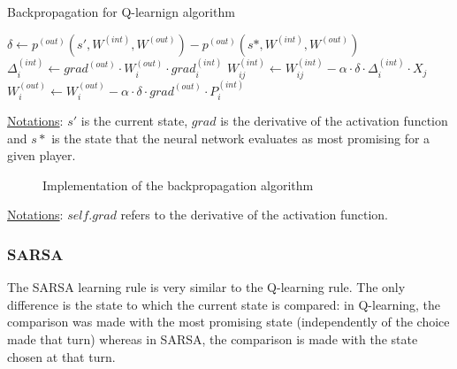 \documentclass{article}
\begin{document}
\begin{algorithm}[H]
	\caption{Backpropagation for Q-learnign algorithm}
	\label{alg:backprop}
	\begin{algorithmic}[1]
	    \State $\delta \leftarrow p^{(out)}(s',W^{(int)},W^{(out)})-p^{(out)}(s*,W^{(int)},W^{(out)}) $
		    \State $\Delta_{i}^{(int)} \leftarrow grad^{(out)} \cdot W_{i}^{(out)} \cdot grad_{i}^{(int)}$
    		    \State $ W_{ij}^{(int)} \leftarrow W_{ij}^{(int)} - \alpha \cdot \delta \cdot \Delta_{i}^{(int)} \cdot X_{j} $
	    	\EndFor
	    	\State $ W_{i}^{(out)} \leftarrow W_{i}^{(out)} - \alpha \cdot \delta \cdot grad^{(out)} \cdot P_{i}^{(int)} $
	    \EndFor
	\end{algorithmic} 
\end{algorithm}

\underline{Notations}: $s'$ is the current state, $grad$ is the derivative of the activation function and $s*$ is the state that the neural network evaluates as most promising for a given player.

\begin{figure}[H]
    \begin{center}
      \label{code:bp-code}
      \caption{Implementation of the backpropagation algorithm}
    \end{center}
\end{figure}

\underline{Notations}: $self.grad$ refers to the derivative of the activation function.

\subsubsection{SARSA}

The SARSA learning rule is very similar to the Q-learning rule. The only difference is the state to which the current state is compared: in Q-learning, the comparison was made with the most promising state (independently of the choice made that turn) whereas in SARSA, the comparison is made with the state chosen at that turn.
\end{document}
